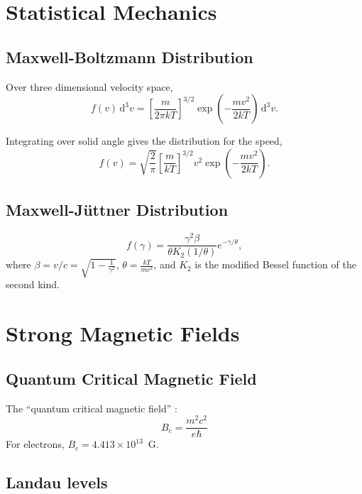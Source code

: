 \documentclass{book}
\begin{document}
\chapter{Statistical Mechanics}

\section{Maxwell-Boltzmann Distribution}

Over three dimensional velocity space,
\begin{equation}
    f(v) \, \text{d}^3 v = \left[\frac{m}{2\pi kT}\right]^{3/2} \exp\left(-\frac{mv^2}{2kT}\right) \, \text{d}^3 v.
\end{equation}

Integrating over solid angle gives the distribution for the speed,
\begin{equation}
    f(v) = \sqrt{\frac{2}{\pi}} \left[ \frac{m}{kT} \right]^{3/2} v^2 \exp\left(-\frac{mv^2}{2kT}\right).
\end{equation}

\section{Maxwell-J\"uttner Distribution}

\begin{equation}
    f(\gamma) = \frac{\gamma^2 \beta}{\theta K_2(1/\theta)} e^{-\gamma/\theta},
\end{equation}
where $\beta = v/c = \sqrt{1 - \frac{1}{\gamma^2}}$, $\theta = \frac{kT}{mc^2}$, and $K_2$ is the modified Bessel function of the second kind.

\chapter{Strong Magnetic Fields}

\section{Quantum Critical Magnetic Field}
\label{sec:qcmf}

The ``quantum critical magnetic field'' \citep[translated to SI units from][]{Diachenko2017}:
\begin{equation}
    B_c = \frac{m^2c^2}{e\hbar}
\end{equation}
For electrons, $B_c = 4.413\times10^{13}\,$ G.

\section{Landau levels}
\end{document}
